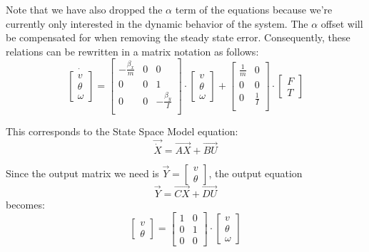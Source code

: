Note that we have also dropped the $ \alpha $ term of the equations because we're currently only interested in the dynamic behavior of the system. The $ \alpha $ offset will be compensated for when removing the steady state error. Consequently, these relations can be rewritten in a matrix notation as follows:
\[
\dot{
	\begin{bmatrix}
	 v\\
	 \theta\\
	 \omega
	\end{bmatrix}
}
=
\begin{bmatrix}
 -\frac{\beta_{x}}{m} & 0 & 0\\
 0 & 0 & 1\\
 0 & 0 & - \frac{\beta_{y}}{I}\\
\end{bmatrix}
\cdot
\begin{bmatrix}
v\\
\theta\\
\omega
\end{bmatrix}
+
\begin{bmatrix}
\frac{1}{m} & 0\\
0 & 0\\
0 & \frac{1}{I}\\
\end{bmatrix}
\cdot
\begin{bmatrix}
F\\
T
\end{bmatrix}
\]

This corresponds to the State Space Model equation:
\[\vec{\dot{X}} = \vec{AX} + \vec{BU}\]

Since the output matrix we need is $ \vec{Y} = \begin{bmatrix}v \\ \theta \end{bmatrix} $, the output equation
\[\vec{Y} = \vec{CX} + \vec{DU}\]
becomes:
\[\begin{bmatrix}v \\ \theta \end{bmatrix}
 = 
\begin{bmatrix}
1 & 0\\
0 & 1\\
0 & 0
\end{bmatrix}
\cdot
\begin{bmatrix}
v\\
\theta\\
\omega
\end{bmatrix}
\]

